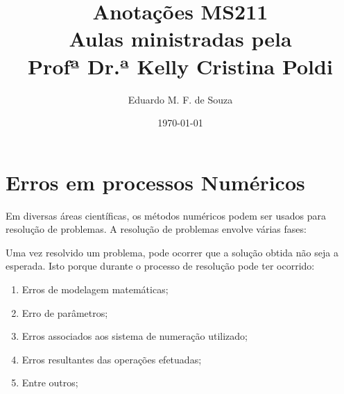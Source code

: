 \documentclass[a4paper,oneside,article,table]{article}
\begin{document}
\title{Anotações MS211\\ \large Aulas ministradas pela\\ Profª Dr.ª Kelly Cristina Poldi}
\author{Eduardo M. F. de Souza}
\date{\today}

\maketitle


\tableofcontents
\newpage

\section{Erros em processos Numéricos}

    \begin{multicols}{2}

        Em diversas áreas científicas, os métodos numéricos podem ser usados para resolução de problemas. A resolução de problemas envolve várias fases:

        \begin{center}
        \end{center}

        Uma vez resolvido um problema, pode ocorrer que a solução obtida não seja a esperada. Isto porque durante o processo de resolução pode ter ocorrido:

        \begin{enumerate}
        \item Erros de modelagem matemáticas;
            \item Erro de parâmetros;
            \item Erros associados aos sistema de numeração utilizado;
            \item Erros resultantes das operações efetuadas;
            \item Entre outros;
        \end{enumerate}

    \end{multicols}
\end{document}
